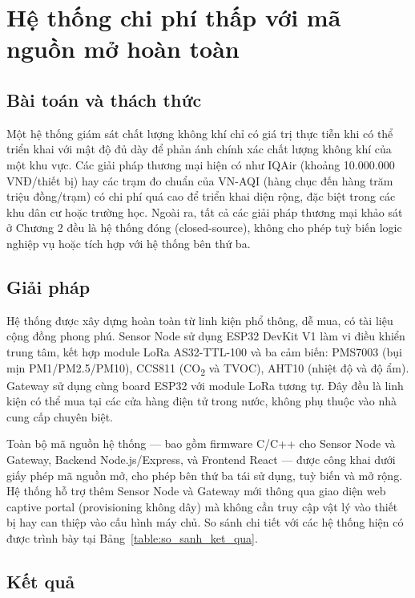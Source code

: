 \documentclass[../DoAn.tex]{subfiles}
\begin{document}
\section{Hệ thống chi phí thấp với mã nguồn mở hoàn toàn}
\label{section:5.4}

\subsection{Bài toán và thách thức}
\label{subsection:5.4.1}

Một hệ thống giám sát chất lượng không khí chỉ có giá trị thực tiễn khi có thể triển khai với mật độ đủ dày để phản ánh chính xác chất lượng không khí của một khu vực. Các giải pháp thương mại hiện có như IQAir (khoảng 10.000.000 VNĐ/thiết bị) hay các trạm đo chuẩn của VN-AQI (hàng chục đến hàng trăm triệu đồng/trạm) có chi phí quá cao để triển khai diện rộng, đặc biệt trong các khu dân cư hoặc trường học. Ngoài ra, tất cả các giải pháp thương mại khảo sát ở Chương 2 đều là hệ thống đóng (closed-source), không cho phép tuỳ biến logic nghiệp vụ hoặc tích hợp với hệ thống bên thứ ba.

\subsection{Giải pháp}
\label{subsection:5.4.2}

Hệ thống được xây dựng hoàn toàn từ linh kiện phổ thông, dễ mua, có tài liệu cộng đồng phong phú. Sensor Node sử dụng ESP32 DevKit V1 làm vi điều khiển trung tâm, kết hợp module LoRa AS32-TTL-100 và ba cảm biến: PMS7003 (bụi mịn PM1/PM2.5/PM10), CCS811 (CO\textsubscript{2} và TVOC), AHT10 (nhiệt độ và độ ẩm). Gateway sử dụng cùng board ESP32 với module LoRa tương tự. Đây đều là linh kiện có thể mua tại các cửa hàng điện tử trong nước, không phụ thuộc vào nhà cung cấp chuyên biệt.

Toàn bộ mã nguồn hệ thống — bao gồm firmware C/C++ cho Sensor Node và Gateway, Backend Node.js/Express, và Frontend React — được công khai dưới giấy phép mã nguồn mở, cho phép bên thứ ba tái sử dụng, tuỳ biến và mở rộng. Hệ thống hỗ trợ thêm Sensor Node và Gateway mới thông qua giao diện web captive portal (provisioning không dây) mà không cần truy cập vật lý vào thiết bị hay can thiệp vào cấu hình máy chủ. So sánh chi tiết với các hệ thống hiện có được trình bày tại Bảng~\ref{table:so_sanh_ket_qua}.

\subsection{Kết quả}
\label{subsection:5.4.3}
\end{document}
